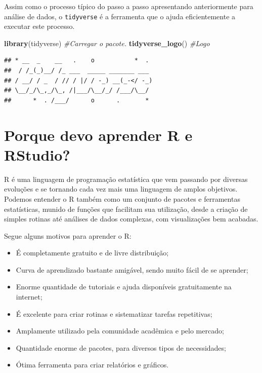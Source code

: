 \documentclass[a4paper]{book}
\newenvironment{Shaded}{\begin{snugshade}}{\end{snugshade}}
\newcommand{\CommentTok}[1]{\textcolor[rgb]{0.56,0.35,0.01}{\textit{#1}}}
\newcommand{\KeywordTok}[1]{\textcolor[rgb]{0.13,0.29,0.53}{\textbf{#1}}}
\newcommand{\NormalTok}[1]{#1}
\providecommand{\tightlist}{%
  \setlength{\itemsep}{0pt}\setlength{\parskip}{0pt}}
\begin{document}
Assim como o processo típico do passo a passo apresentando anteriormente para análise de dados, o \texttt{tidyverse} é a ferramenta que o ajuda eficientemente a executar este processo.

\begin{Shaded}
\begin{Highlighting}[]
\KeywordTok{library}\NormalTok{(tidyverse) }\CommentTok{#Carregar o pacote.}
\KeywordTok{tidyverse_logo}\NormalTok{() }\CommentTok{#Logo}
\end{Highlighting}
\end{Shaded}

\begin{verbatim}
## * __  _    __   .    o           *  . 
##  / /_(_)__/ /_ ___  _____ _______ ___ 
## / __/ / _  / // / |/ / -_) __(_-</ -_)
## \__/_/\_,_/\_, /|___/\__/_/ /___/\__/ 
##      *  . /___/      o      .       *
\end{verbatim}

\hypertarget{porque-devo-aprender-r-e-rstudio}{%
\section{Porque devo aprender R e RStudio?}\label{porque-devo-aprender-r-e-rstudio}}

R é uma linguagem de programação estatística que vem passando por diversas evoluções e se tornando cada vez mais uma linguagem de amplos objetivos. Podemos entender o R também como um conjunto de pacotes e ferramentas estatísticas, munido de funções que facilitam sua utilização, desde a criação de simples rotinas até análises de dados complexas, com visualizações bem acabadas.

Segue alguns motivos para aprender o R:

\begin{itemize}
\tightlist
\item
  É completamente gratuito e de livre distribuição;
\item
  Curva de aprendizado bastante amigável, sendo muito fácil de se aprender;
\item
  Enorme quantidade de tutoriais e ajuda disponíveis gratuitamente na internet;
\item
  É excelente para criar rotinas e sistematizar tarefas repetitivas;
\item
  Amplamente utilizado pela comunidade acadêmica e pelo mercado;
\item
  Quantidade enorme de pacotes, para diversos tipos de necessidades;
\item
  Ótima ferramenta para criar relatórios e gráficos.
\end{itemize}
\end{document}
